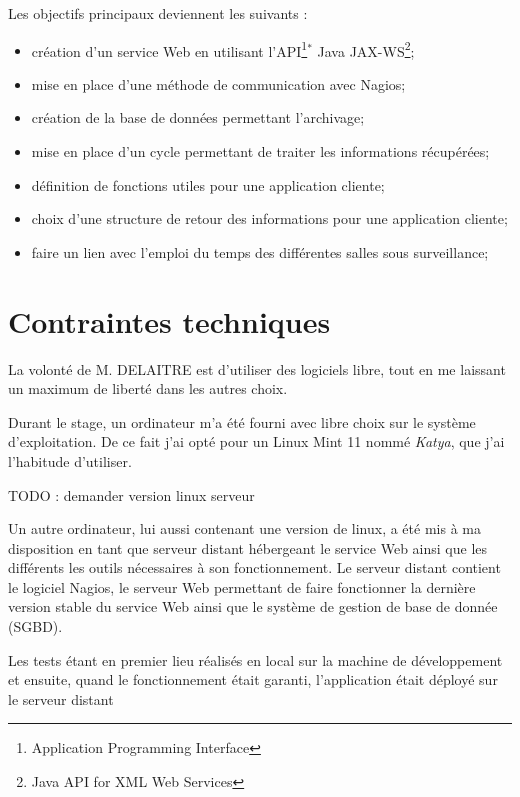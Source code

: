 \noindent Les objectifs principaux deviennent les suivants :
\begin{itemize}
	\item cr\'eation d'un service Web en utilisant l'API\protect\footnote{Application Programming Interface}$^*$ Java JAX-WS\protect\footnote{Java API for XML Web Services};
	\item mise en place d'une m\'ethode de communication avec Nagios;
	\item cr\'eation de la base de donn\'ees permettant l'archivage;
	\item mise en place d'un cycle permettant de traiter les informations r\'ecup\'er\'ees;
	\item d\'efinition de fonctions utiles pour une application cliente;
	\item choix d'une structure de retour des informations pour une application cliente;
	\item faire un lien avec l'emploi du temps des diff\'erentes salles sous surveillance;

\end{itemize}


\section{Contraintes techniques}

La volont\'e de M. DELAITRE est d'utiliser des logiciels libre, tout en me laissant un maximum de libert\'e dans les autres choix.

Durant le stage, un ordinateur m'a \'et\'e fourni avec libre choix sur le syst\`eme d'exploitation.
De ce fait j'ai opt\'e pour un Linux Mint 11 nomm\'e \textit{Katya}, que j'ai l'habitude d'utiliser.

 TODO : demander version linux serveur

Un autre ordinateur, lui aussi contenant une version de linux, a \'et\'e mis \`a ma disposition en tant que serveur distant h\'ebergeant le service Web ainsi que les diff\'erents les outils n\'ecessaires \`a son fonctionnement.
Le serveur distant contient le logiciel Nagios, le serveur Web permettant de faire fonctionner la derni\`ere version stable du service Web ainsi que le syst\`eme de gestion de base de donn\'ee (SGBD).

Les tests \'etant en premier lieu r\'ealis\'es en local sur la machine de d\'eveloppement et ensuite, quand le fonctionnement \'etait garanti, l'application \'etait d\'eploy\'e sur le serveur distant



\clearpage
